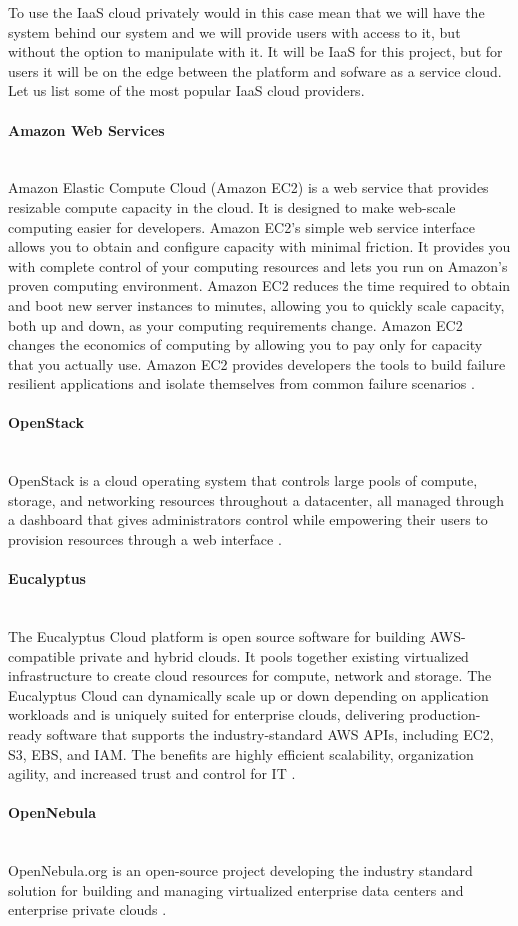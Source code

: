 \documentclass[thesis=B,english]{FITthesis}[2013/04/26]
\newcommand{\myparagraph}[1]{\paragraph{#1}\mbox{}\\}
\begin{document}
To use the IaaS cloud privately would in this case mean that we will have the system behind our system and we will provide users with access to it, but without the option to manipulate with it. It will be IaaS for this project, but for users it will be on the edge between the platform and sofware as a service cloud. Let us list some of the most popular IaaS cloud providers.

\myparagraph{Amazon Web Services}

Amazon Elastic Compute Cloud (Amazon EC2) is a web service that provides resizable compute capacity in the cloud. It is designed to make web-scale computing easier for developers. Amazon EC2’s simple web service interface allows you to obtain and configure capacity with minimal friction. It provides you with complete control of your computing resources and lets you run on Amazon’s proven computing environment. Amazon EC2 reduces the time required to obtain and boot new server instances to minutes, allowing you to quickly scale capacity, both up and down, as your computing requirements change. Amazon EC2 changes the economics of computing by allowing you to pay only for capacity that you actually use. Amazon EC2 provides developers the tools to build failure resilient applications and isolate themselves from common failure scenarios \cite{aws}.

\myparagraph{OpenStack}

OpenStack is a cloud operating system that controls large pools of compute, storage, and networking resources throughout a datacenter, all managed through a dashboard that gives administrators control while empowering their users to provision resources through a web interface \cite{openstack}.

\myparagraph{Eucalyptus}

The Eucalyptus Cloud platform is open source software for building AWS-compatible private and hybrid clouds. It pools together existing virtualized infrastructure to create cloud resources for compute, network and storage. The Eucalyptus Cloud can dynamically scale up or down depending on application workloads and is uniquely suited for enterprise clouds, delivering production-ready software that supports the industry-standard AWS APIs, including EC2, S3, EBS, and IAM. The benefits are highly efficient scalability, organization agility, and increased trust and control for IT \cite{eucalyptus}.

\myparagraph{OpenNebula}

OpenNebula.org is an open-source project developing the industry standard solution for building and managing virtualized enterprise data centers and enterprise private clouds \cite{opennebula}. \\
\end{document}
